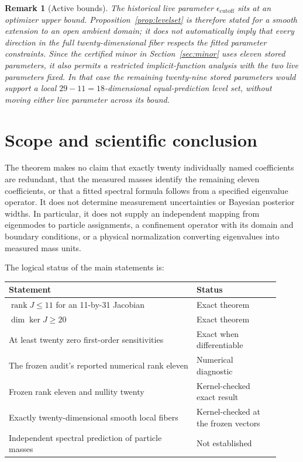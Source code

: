 \documentclass[11pt]{article}
\newtheorem{remark}[theorem]{Remark}
\newcommand{\rank}{\operatorname{rank}}
\newcommand{\Null}{\operatorname{ker}}
\begin{document}
\begin{remark}[Active bounds]
The historical live parameter \(\epsilon_{\mathrm{cutoff}}\) sits at an
optimizer upper bound. Proposition~\ref{prop:levelset} is therefore
stated for a smooth extension to an \emph{open} ambient domain; it does
not automatically imply that every direction in the full twenty-dimensional
fiber respects the fitted parameter constraints. Since the certified
minor in Section~\ref{sec:minor} uses eleven
\emph{stored} parameters, it also permits a
restricted implicit-function analysis with the two live parameters fixed.
In that case the remaining twenty-nine stored parameters would support
a local \(29-11=18\)-dimensional equal-prediction level set, without
moving either live parameter across its bound.
\end{remark}

\section{Scope and scientific conclusion}

The theorem makes no claim that exactly twenty individually named
coefficients are redundant, that the measured masses identify the
remaining eleven coefficients, or that a fitted spectral formula follows
from a specified eigenvalue operator. It does not determine measurement
uncertainties or Bayesian posterior widths. In particular, it does not
supply an independent mapping from eigenmodes to particle assignments,
a confinement operator with its domain and boundary conditions, or a
physical normalization converting eigenvalues into measured mass units.

The logical status of the main statements is:
\begin{center}
\begin{tabular}{p{0.63\linewidth}p{0.29\linewidth}}
\toprule
Statement & Status\\
\midrule
\(\rank J\leq11\) for an 11-by-31 Jacobian & Exact theorem\\
\(\dim\Null J\geq20\) & Exact theorem\\
At least twenty zero first-order sensitivities & Exact when differentiable\\
The frozen audit's reported numerical rank eleven & Numerical diagnostic\\
Frozen rank eleven and nullity twenty & Kernel-checked exact result\\
Exactly twenty-dimensional smooth local fibers & Kernel-checked at the frozen vectors\\
Independent spectral prediction of particle masses & Not established\\
\bottomrule
\end{tabular}
\end{center}
\end{document}
